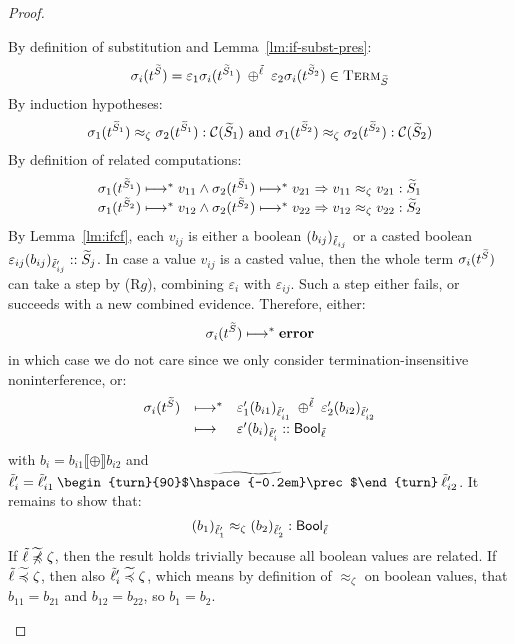 \documentclass[authoryear,sort&compress,9pt,twocolumn,nocopyrightspace]{sigplanconf}
\newcommand{\Bool}{\mathsf{Bool}}
\newcommand{\oblset}[1]{\textsc{#1}}
\newcommand{\?}{\textsf{\upshape ?}} \newcommand{\consistent}[1]{\widetilde{#1}}
\newcommand{\ljoincore}{\begin{turn}{90}$\hspace{-0.2em}\prec$\end{turn}}
\newcommand{\cjoin}{\mathbin{\consistent{\ljoincore}}}
\newcommand{\cljoin}{\cjoin}
\newcommand{\TermT}[1]{\oblset{Term}_{#1}}
\newcommand{\cast}[2]{\evcast{\evpr{#1}}{#2}}
\newcommand{\error}{\textup{\textbf{error}}}
\newcommand{\red}{\longmapsto}
\newcommand{\ev}{\varepsilon}
\newcommand{\evcast}[2]{#1#2}
\newcommand{\evpr}[1]{\braket{#1}}
\newcommand{\ncsubl}{\not \hspace{-2mm}\csubl}
\newcommand{\lobs}{\zeta}
\newcommand{\rel}{\approx_{\lobs}}
\newcommand{\rcomp}[1]{\mathcal{C}(#1)}
\newcommand{\subst}{\sigma}
\newcommand{\itm}[1]{{t^{\cS_{#1}}}}
\renewcommand{\cast}[2]{#1#2}
\begin{document}
\begin{proof}
\begin{case}[$\oplus$]
\noindent By definition of substitution and Lemma~\ref{lm:if-subst-pres}:
\begin{displaymath}
\subst_i(\itm{}) = 
\cast{\ev_1}{\subst_i(\itm{1})} \;\oplus^\clx\;
\cast{\ev_2}{\subst_i(\itm{2})} \in \TermT{\cS}
\end{displaymath}
By induction hypotheses:
\begin{displaymath}
\subst_1(\itm{1}) \rel \subst_2(\itm{1}) : \rcomp{\cS_1} \text{ and }
\subst_1(\itm{2}) \rel \subst_2(\itm{2}) : \rcomp{\cS_2}
\end{displaymath}
By definition of related computations:
\begin{displaymath}
\begin{array}{c}
\subst_1(\itm{1}) \red^{*} v_{11} \wedge \subst_2(\itm{1}) \red^{*} v_{21}
=> v_{11} \rel v_{21} : \cS_1\\
\subst_1(\itm{2}) \red^{*} v_{12} \wedge \subst_2(\itm{2}) \red^{*} v_{22}
=> v_{12} \rel v_{22} : \cS_2
\end{array}
\end{displaymath}                 
By Lemma~\ref{lm:ifcf}, each $v_{ij}$ is either a boolean
$(b_{ij})_{{\tilde{\ell}}_{ij}}$ or a
casted boolean $\cast{\ev_{ij}}{(b_{ij})_{\clx'_{ij}}} :: \cS_j$. 
In case a value $v_{ij}$ is a casted value, then the whole term
$\subst_i(\itm{})$ can take a step by (R$g$), combining $\ev_i$ with
$\ev_{ij}$. Such a step either fails, or
succeeds with a new combined evidence. Therefore, either:
\begin{displaymath}
\subst_i(\itm{}) \red^{*} \error
\end{displaymath}
in which case we do not care since
we only consider termination-insensitive noninterference, or:
\begin{displaymath}
\begin{array}{rll}
\subst_i(\itm{}) & \red^{*}&
\cast{\ev'_1}{(b_{i1})_{\clx'_{i1}}} \;\oplus^\clx\;
\cast{\ev'_2}{(b_{i2})_{\clx'_{i2}}}\\[0.3em]
& \red& \cast{\ev'}{(b_i)_{\clx'_i}} :: \Bool_\clx
\end{array}
\end{displaymath}
with $b_i = b_{i1} \llbracket\oplus\rrbracket b_{i2}$ and $\clx'_i =
\clx'_{i1}\cljoin\clx'_{i2}$. It remains to show that:
\begin{displaymath}
(b_1)_{\clx'_1} 
\rel
(b_2)_{\clx'_2} 
: \Bool_\clx
\end{displaymath}
If $\clx \ncsubl \lobs$, then the result holds trivially because
all boolean values are related. If $\clx \csubl \lobs$, then also
$\clx'_i \csubl \lobs$, which means by definition of $\rel$ on boolean
values, that $b_{11} = b_{21}$ and $b_{12} = b_{22}$, so $b_1 = b_2$.


\end{case}
\end{proof}
\end{document}
